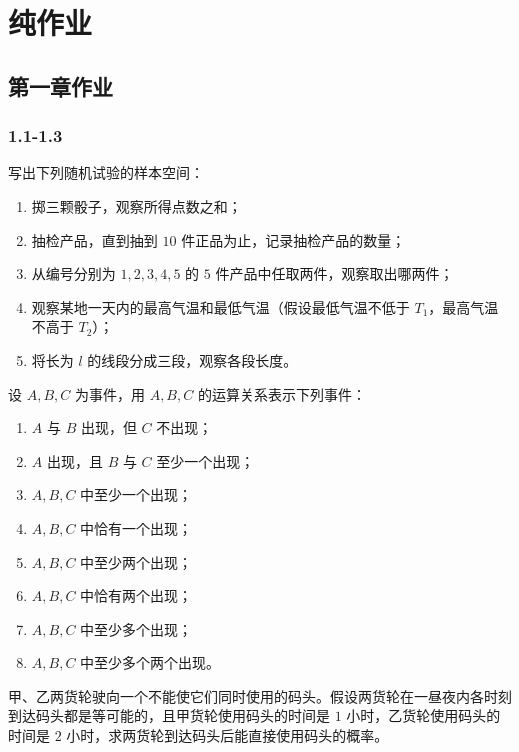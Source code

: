 \chapter{纯作业}
\section{第一章作业}
\subsection*{1.1-1.3}

\begin{homework}[1.1]
写出下列随机试验的样本空间：

\begin{enumerate}
  \item 掷三颗骰子，观察所得点数之和；
  \item 抽检产品，直到抽到 $10$ 件正品为止，记录抽检产品的数量；
  \item 从编号分别为 $1,2,3,4,5$ 的 $5$ 件产品中任取两件，观察取出哪两件；
  \item 观察某地一天内的最高气温和最低气温（假设最低气温不低于 $T_1$，最高气温不高于 $T_2$）；
  \item 将长为 $l$ 的线段分成三段，观察各段长度。
\end{enumerate}
\end{homework}

\begin{homework}[1.2]
设 $A,B,C$ 为事件，用 $A,B,C$ 的运算关系表示下列事件：

\begin{enumerate}
  \item $A$ 与 $B$ 出现，但 $C$ 不出现；
  \item $A$ 出现，且 $B$ 与 $C$ 至少一个出现；
  \item $A,B,C$ 中至少一个出现；
  \item $A,B,C$ 中恰有一个出现；
  \item $A,B,C$ 中至少两个出现；
  \item $A,B,C$ 中恰有两个出现；
  \item $A,B,C$ 中至少多个出现；
  \item $A,B,C$ 中至少多个两个出现。
\end{enumerate}
\end{homework}

\begin{homework}[1.12]
甲、乙两货轮驶向一个不能使它们同时使用的码头。假设两货轮在一昼夜内各时刻到达码头都是等可能的，且甲货轮使用码头的时间是 $1$ 小时，乙货轮使用码头的时间是 $2$ 小时，求两货轮到达码头后能直接使用码头的概率。
\end{homework}

